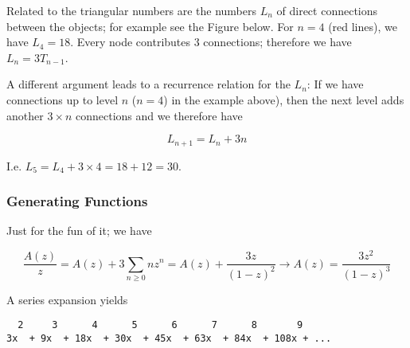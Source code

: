 Related to the triangular numbers are the numbers $L_n$ of direct connections between the objects; for example see the Figure below. For $n=4$ (red lines), we have $L_4 = 18$. Every node contributes
$3$ connections; therefore we have $L_n = 3 T_{n-1}$.


\begin{figure}
\centering
\end{figure}

A different argument leads to a recurrence relation for the $L_n$: If we have connections up to level $n$ ($n=4$) in the example above), then the next level adds another $3 \times n$ connections and we therefore have

\[ L_{n+1} = L_n + 3n\]

I.e. $L_5 = L_4 + 3 \times 4 = 18 + 12 = 30$.

\subsubsection{Generating Functions}

Just for the fun of it; we have

\[ \frac{A(z)}{z} = A(z) + 3 \sum_{n \geq 0} n z^n = A(z) + \frac{3z}{(1-z)^2} \rightarrow A(z) = \frac{3z^2}{(1-z)^3}\]

A series expansion yields

\begin{verbatim}
  2     3      4      5      6      7      8       9
3x  + 9x  + 18x  + 30x  + 45x  + 63x  + 84x  + 108x + ...
\end{verbatim}
